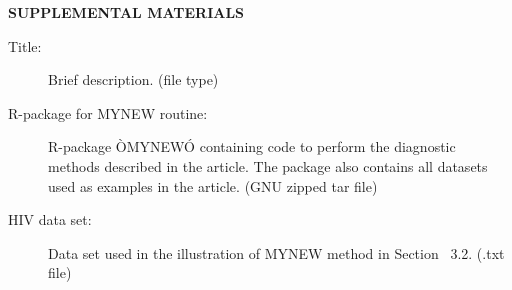 \documentclass[12pt]{article}
\begin{document}
  
  \bigskip
  \begin{center}
  {\large\bf SUPPLEMENTAL MATERIALS}
  \end{center}
  
  \begin{description}
  
  \item[Title:] Brief description. (file type)
  
  \item[R-package for  MYNEW routine:] R-package ÒMYNEWÓ containing code to perform the diagnostic methods described in the article. The package also contains all datasets used as examples in the article. (GNU zipped tar file)
  
  \item[HIV data set:] Data set used in the illustration of MYNEW method in Section~ 3.2. (.txt file)
  
  \end{description}
  
  \appendix
  
  
  
  
  
  
\end{document}
